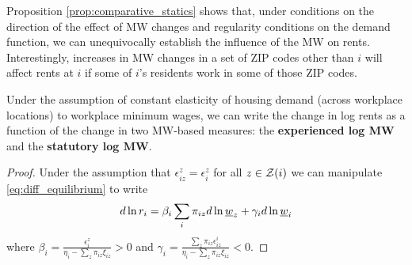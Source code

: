 Proposition \ref{prop:comparative_statics} shows that, under conditions on the 
direction of the effect of MW changes and regularity conditions on the demand 
function, we can unequivocally establish the influence of the MW on rents. 
Interestingly, increases in MW changes in a set of ZIP codes other than $i$
will affect rents at $i$ if some of $i$'s residents work in some of those ZIP codes.

\begin{prop}[Representation]\label{prop:representation}
    Under the assumption of constant elasticity of housing demand (across workplace locations)
    to workplace minimum wages,
    we can write the change in log rents as a function of the change in two 
    MW-based measures: the \textbf{experienced log MW} and the \textbf{statutory 
    log MW}.
\end{prop}
\begin{proof}
    Under the assumption that $\epsilon_{iz}^z = \epsilon_i^z$ for all $z\in\mathcal{Z}(i)$ 
    we can manipulate \eqref{eq:diff_equilibrium} to write
    \begin{equation} \label{eq:theory_represenation}
        d \ln r_i = \beta_i \sum_i \pi_{iz} d\ln \underline{w}_z + \gamma_i d \ln \underline{w}_i
    \end{equation}
    where $\beta_i = \frac{\epsilon_{i}^z}{\eta_{i} - \sum_z \pi_{iz} \xi_{iz}} 
    >0$ and $\gamma_i = \frac{\sum_z \pi_{iz} \epsilon_{iz}^i}{\eta_{i} 
            - \sum_z \pi_{iz} \xi_{iz}} < 0$.
\end{proof}


